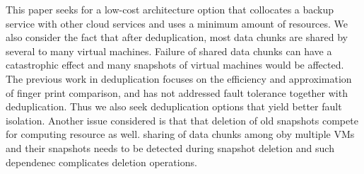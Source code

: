 This paper seeks for a low-cost architecture option  that collocates
a backup service with other cloud services and  uses a minimum amount of resources. 
We also consider the fact that after
deduplication, most data chunks are shared by several to many virtual machines.
Failure of shared data chunks can have a catastrophic effect and many
snapshots of virtual machines would be affected.
The previous work in deduplication focuses on the efficiency and approximation of
finger print comparison, and has not addressed fault tolerance together with deduplication.
Thus we also seek deduplication options that yield better fault isolation.
Another issue considered is that
that deletion of old snapshots compete for computing resource as well. 
sharing of data chunks among oby multiple VMs and their snapshots needs to be detected during
snapshot   deletion and such dependenec complicates deletion operations. 



